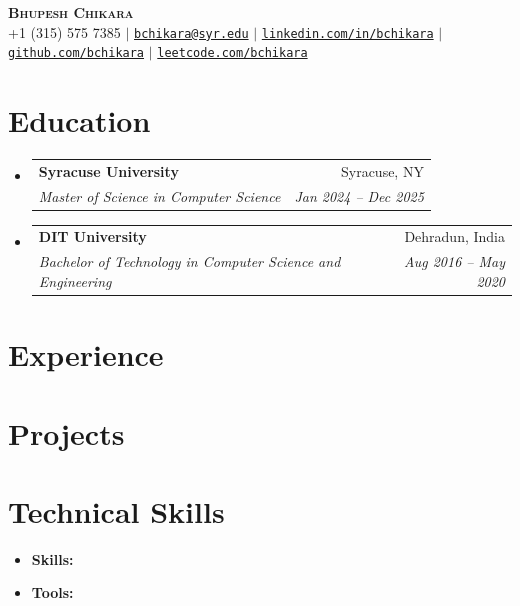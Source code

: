 \documentclass[letterpaper,11pt]{article}
\makeatletter
\newcommand{\resumeItem}[1]{
  \item\small{
    {#1 \vspace{-2pt}}
  }
}
\newcommand{\resumeSubheading}[4]{
  \vspace{-2pt}\item
    \begin{tabular*}{0.97\textwidth}[t]{l@{\extracolsep{\fill}}r}
      \textbf{#1} & #2 \\
      \textit{\small#3} & \textit{\small #4} \\
    \end{tabular*}\vspace{-7pt}
}
\newcommand{\resumeProjectHeading}[2]{
    \item
    \begin{tabular*}{0.97\textwidth}{l@{\extracolsep{\fill}}r}
      \small\textbf{#1} & #2 \\
    \end{tabular*}\vspace{-7pt}
}
\newcommand{\resumeSubHeadingListStart}{\begin{itemize}[leftmargin=0.15in, label={}]}
\newcommand{\resumeSubHeadingListEnd}{\end{itemize}}
\makeatother
\begin{document}
\begin{center}
    \textbf{\Huge \scshape Bhupesh Chikara} \\ \vspace{1pt}
    \small +1 (315) 575 7385 $|$
    \href{mailto:bchikara@syr.edu}{\nolinkurl{bchikara@syr.edu}} $|$
    \href{https://linkedin.com/in/bchikara}{\nolinkurl{linkedin.com/in/bchikara}} $|$
    \href{https://github.com/bchikara}{\nolinkurl{github.com/bchikara}} $|$
    \href{https://leetcode.com/bchikara}{\nolinkurl{leetcode.com/bchikara}}
\end{center}


\section{Education}
  \resumeSubHeadingListStart
    \resumeSubheading
      {Syracuse University}{Syracuse, NY}
      {Master of Science in Computer Science}{Jan 2024 -- Dec 2025}
    \resumeSubheading
      {DIT University}{Dehradun, India}
      {Bachelor of Technology in Computer Science and Engineering}{Aug 2016 -- May 2020}
  \resumeSubHeadingListEnd


\section{Experience}
  \resumeSubHeadingListStart
  \resumeSubHeadingListEnd


\section{Projects}
    \resumeSubHeadingListStart
    \resumeSubHeadingListEnd


\section{Technical Skills}
 \begin{itemize}[leftmargin=0.15in, itemsep=1pt, topsep=2pt, parsep=0pt, label={}] %
    \item \small \textbf{Skills:} %
    \item \small \textbf{Tools:} %
 \end{itemize}


\end{document}
